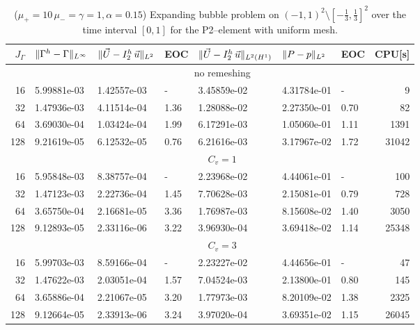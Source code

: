 \begin{table}
\center
\hspace*{-3.25cm}
\begin{tabular}{rllllllr}
\hline
$J_\Gamma$ & $\|\Gamma^h - \Gamma\|_{L^\infty}$ & $\|\vec U - I^h_{2}\,\vec u\|_{L^2}$ & EOC & $\|\vec U - I^h_{2}\,\vec u\|_{L^2(H^1)}$ & $\|P - p\|_{L^2}$ & EOC
& CPU[s] \\
\hline
& \multicolumn{7}{c}{no remeshing} \\
\hline
 16 & 5.99881e-03 & 1.42557e-03 &    - & 3.45859e-02 & 4.31784e-01 &    - &
9 \\
 32 & 1.47936e-03 & 4.11514e-04 & 1.36 & 1.28088e-02 & 2.27350e-01 & 0.70 &
82 \\
 64 & 3.69030e-04 & 1.03424e-04 & 1.99 & 6.17291e-03 & 1.05060e-01 & 1.11 &
1391 \\
128 & 9.21619e-05 & 6.12532e-05 & 0.76 & 6.21616e-03 & 3.17967e-02 & 1.72 &
31042 \\
\hline
& \multicolumn{7}{c}{$C_v=1$} \\
\hline
 16 & 5.95848e-03 & 8.38757e-04 &    - & 2.23968e-02 & 4.44061e-01 &    - &
100 \\
 32 & 1.47123e-03 & 2.22736e-04 & 1.45 & 7.70628e-03 & 2.15081e-01 & 0.79 &
728 \\
 64 & 3.65750e-04 & 2.16681e-05 & 3.36 & 1.76987e-03 & 8.15608e-02 & 1.40 &
3050 \\
128 & 9.12893e-05 & 2.33116e-06 & 3.22 & 3.96930e-04 & 3.69418e-02 & 1.14 &
25348 \\
\hline
& \multicolumn{7}{c}{$C_v=3$} \\
\hline
 16 & 5.99703e-03 & 8.59166e-04 &    - & 2.23227e-02 & 4.44656e-01 &    - &
47 \\
 32 & 1.47622e-03 & 2.03051e-04 & 1.57 & 7.04524e-03 & 2.13800e-01 & 0.80 &
145 \\
 64 & 3.65886e-04 & 2.21067e-05 & 3.20 & 1.77973e-03 & 8.20109e-02 & 1.38 &
2325 \\
128 & 9.12664e-05 & 2.33913e-06 & 3.24 & 3.97020e-04 & 3.69351e-02 & 1.15 &
26045 \\
\hline
\end{tabular}
\hspace*{-3.25cm}
\caption[Stokes expanding bubble uniform mesh errors P2--\pdg]
{($\mu_+ = 10\,\mu_- = \gamma = 1,\alpha = 0.15$) Expanding bubble
problem on $(-1,1)^2\setminus[-\frac{1}{3},\frac{1}{3}]^2$ over the time
interval $[0,1]$ for the P2--\pdg element with uniform mesh.}
\label{tab:expandingbubble2Dp2p1dg}
\end{table}
